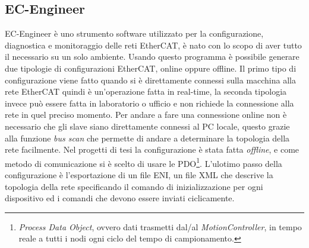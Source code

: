 \subsection{EC-Engineer}
EC-Engineer è uno strumento software utilizzato per la configurazione, diagnostica e monitoraggio delle reti EtherCAT, è nato con lo scopo di aver tutto il necessario su un solo ambiente. Usando questo programma è possibile generare due tipologie di configurazioni EtherCAT, online oppure offline. Il primo tipo di configurazione viene fatto quando si è direttamente connessi sulla macchina alla rete EtherCAT quindi è un'operazione fatta in real-time, la seconda tipologia invece può essere fatta in laboratorio o ufficio e non richiede la connessione alla rete in quel preciso momento. Per andare a fare una connessione online non è necessario che gli slave siano direttamente connessi al PC locale, questo grazie alla funzione \textit{bus scan} che permette di andare a determinare la topologia della rete facilmente. Nel progetti di tesi la configurazione è stata fatta \textit{offline}, e come metodo di comunicazione si è scelto di usare le PDO\footnote{\textit{Process Data Object}, ovvero dati trasmetti dal/al \textit{MotionController}, in tempo reale a tutti i nodi ogni ciclo del tempo di campionamento.}. L'ulotimo passo della configurazione è l'esportazione di un file ENI, un file XML che descrive la topologia della rete specificando il comando di inizializzazione per ogni dispositivo ed i comandi che devono essere inviati ciclicamente.
